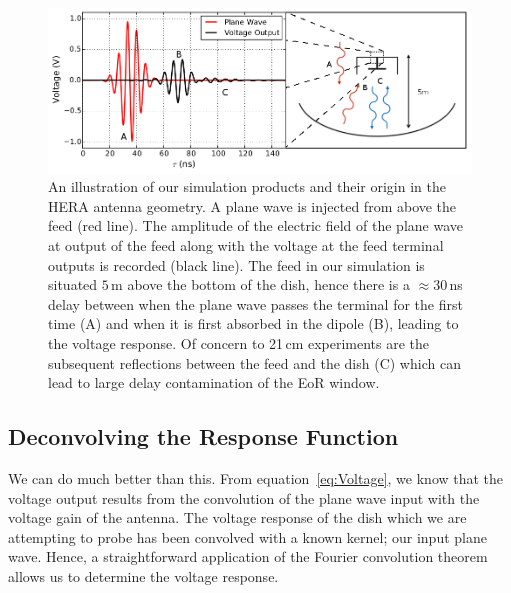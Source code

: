 \documentclass[twocolumn]{emulateapj}
\begin{document}
\begin{figure}
\includegraphics[width=\textwidth]{figures/SimulationIllustration.png}
\caption{An illustration of our simulation products and their origin in the HERA antenna geometry. A plane wave is injected from above the feed (red line). The amplitude of the electric field of the plane wave at output of the feed along with the voltage at the feed terminal outputs is recorded (black line). The feed in our simulation is situated $5$\,m above the bottom of the dish, hence there is a $\approx 30$\,ns delay between when the plane wave passes the terminal for the first time (A) and when it is first absorbed in the dipole (B), leading to the voltage response. Of concern to 21\,cm experiments are the subsequent reflections between the feed and the dish (C) which can lead to large delay contamination of the EoR window.}
\label{fig:SimulationOutput}
\end{figure}
\subsection{Deconvolving the Response Function}\label{ssec:Deconvolve}

We can do much better than this. From equation~\ref{eq:Voltage}, we know that the voltage output results from the convolution of the plane wave input with the voltage gain of the antenna. The voltage response of the dish which we are attempting to probe has been convolved with a known kernel; our input plane wave. Hence, a straightforward application of the Fourier convolution theorem allows us to determine the voltage response.
\end{document}
